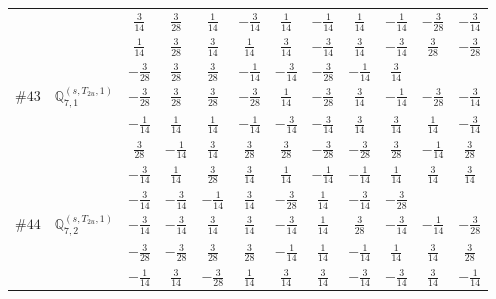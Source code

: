 \documentclass[fleqn,9pt,landscape]{jsarticle}
\begin{document}
\begin{center}
\begin{longtable}{lcccccccccc}
& $ \frac{3}{14} $ & $ \frac{3}{28} $ & $ \frac{1}{14} $ & $ - \frac{3}{14} $ & $ \frac{1}{14} $ & $ - \frac{1}{14} $ & $ \frac{1}{14} $ & $ - \frac{1}{14} $ & $ - \frac{3}{28} $ & $ - \frac{3}{14} $ \\
& $ \frac{1}{14} $ & $ \frac{3}{28} $ & $ \frac{3}{14} $ & $ \frac{1}{14} $ & $ \frac{3}{14} $ & $ - \frac{3}{14} $ & $ \frac{3}{14} $ & $ - \frac{3}{14} $ & $ \frac{3}{28} $ & $ - \frac{3}{28} $ \\
& $ - \frac{3}{28} $ & $ \frac{3}{28} $ & $ \frac{3}{28} $ & $ - \frac{1}{14} $ & $ - \frac{3}{14} $ & $ - \frac{3}{28} $ & $ - \frac{1}{14} $ & $ \frac{3}{14} $ & $  $ & $  $ \\ \hline
$ \#43\quad \mathbb{Q}_{7,1}^{(s,T_{2u},1)} $ & $ - \frac{3}{28} $ & $ \frac{3}{28} $ & $ \frac{3}{28} $ & $ - \frac{3}{28} $ & $ \frac{1}{14} $ & $ - \frac{3}{28} $ & $ \frac{3}{14} $ & $ - \frac{1}{14} $ & $ - \frac{3}{28} $ & $ - \frac{3}{14} $ \\
& $ - \frac{1}{14} $ & $ \frac{1}{14} $ & $ \frac{1}{14} $ & $ - \frac{1}{14} $ & $ - \frac{3}{14} $ & $ - \frac{3}{14} $ & $ \frac{3}{14} $ & $ \frac{3}{14} $ & $ \frac{1}{14} $ & $ - \frac{3}{14} $ \\
& $ \frac{3}{28} $ & $ - \frac{1}{14} $ & $ \frac{3}{14} $ & $ \frac{3}{28} $ & $ \frac{3}{28} $ & $ - \frac{3}{28} $ & $ - \frac{3}{28} $ & $ \frac{3}{28} $ & $ - \frac{1}{14} $ & $ \frac{3}{28} $ \\
& $ - \frac{3}{14} $ & $ \frac{1}{14} $ & $ \frac{3}{28} $ & $ \frac{3}{14} $ & $ \frac{1}{14} $ & $ - \frac{1}{14} $ & $ - \frac{1}{14} $ & $ \frac{1}{14} $ & $ \frac{3}{14} $ & $ \frac{3}{14} $ \\
& $ - \frac{3}{14} $ & $ - \frac{3}{14} $ & $ - \frac{1}{14} $ & $ \frac{3}{14} $ & $ - \frac{3}{28} $ & $ \frac{1}{14} $ & $ - \frac{3}{14} $ & $ - \frac{3}{28} $ & $  $ & $  $ \\ \hline
$ \#44\quad \mathbb{Q}_{7,2}^{(s,T_{2u},1)} $ & $ - \frac{3}{14} $ & $ - \frac{3}{14} $ & $ \frac{3}{14} $ & $ \frac{3}{14} $ & $ - \frac{3}{14} $ & $ \frac{1}{14} $ & $ \frac{3}{28} $ & $ - \frac{3}{14} $ & $ - \frac{1}{14} $ & $ - \frac{3}{28} $ \\
& $ - \frac{3}{28} $ & $ - \frac{3}{28} $ & $ \frac{3}{28} $ & $ \frac{3}{28} $ & $ - \frac{1}{14} $ & $ \frac{1}{14} $ & $ - \frac{1}{14} $ & $ \frac{1}{14} $ & $ \frac{3}{14} $ & $ \frac{3}{28} $ \\
& $ - \frac{1}{14} $ & $ \frac{3}{14} $ & $ - \frac{3}{28} $ & $ \frac{1}{14} $ & $ \frac{3}{14} $ & $ \frac{3}{14} $ & $ - \frac{3}{14} $ & $ - \frac{3}{14} $ & $ \frac{3}{14} $ & $ - \frac{1}{14} $ \\

\end{longtable}
\end{center}
\end{document}
